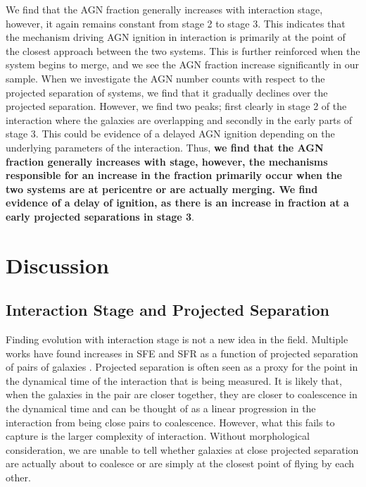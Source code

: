\documentclass[fleqn,usenatbib]{mnras}
\begin{document}
We find that the AGN fraction generally increases with interaction stage, however, it again remains constant from stage 2 to stage 3. This indicates that the mechanism driving AGN ignition in interaction is primarily at the point of the closest approach between the two systems. This is further reinforced when the system begins to merge, and we see the AGN fraction increase significantly in our sample. When we investigate the AGN number counts with respect to the projected separation of systems, we find that it gradually declines over the projected separation. However, we find two peaks; first clearly in stage 2 of the interaction where the galaxies are overlapping and secondly in the early parts of stage 3. This could be evidence of a delayed AGN ignition depending on the underlying parameters of the interaction. Thus, \textbf{we find that the AGN fraction generally increases with stage, however, the mechanisms responsible for an increase in the fraction primarily occur when the two systems are at pericentre or are actually merging. We find evidence of a delay of ignition, as there is an increase in fraction at a early projected separations in stage 3}.

\section{Discussion}\label{discussion}
\subsection{Interaction Stage and Projected Separation}
\noindent Finding evolution with interaction stage is not a new idea in the field. Multiple works have found increases in SFE and SFR as a function of projected separation of pairs of galaxies \citep{2000ApJ...530..660B, 2008AJ....135.1877E, 2013MNRAS.433L..59P}. Projected separation is often seen as a proxy for the point in the dynamical time of the interaction that is being measured. It is likely that, when the galaxies in the pair are closer together, they are closer to coalescence in the dynamical time and can be thought of as a linear progression in the interaction from being close pairs to coalescence. However, what this fails to capture is the larger complexity of interaction. Without morphological consideration, we are unable to tell whether galaxies at close projected separation are actually about to coalesce or are simply at the closest point of flying by each other.
\end{document}
